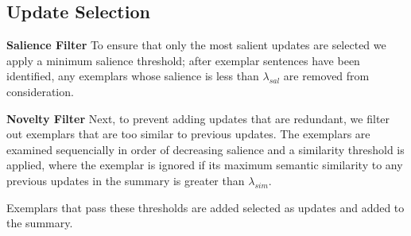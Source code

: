 \subsection{Update Selection}
\label{sec:upsel}

\textbf{Salience Filter } To 
ensure that only the most salient updates are selected we apply a minimum
salience threshold;
after exemplar sentences have been identified, any exemplars whose salience is 
less than $\lambda_{sal}$ are removed from consideration. 

\textbf{Novelty Filter } Next,
to prevent adding updates that are redundant, we filter out exemplars
that are too similar to previous updates.
The exemplars are examined
sequencially in order of decreasing salience and  a similarity threshold 
is applied, where the exemplar is ignored if its
maximum semantic similarity to any previous updates in the summary is
greater than $\lambda_{sim}$.

Exemplars that pass these thresholds are added selected as updates and added
to the summary.




